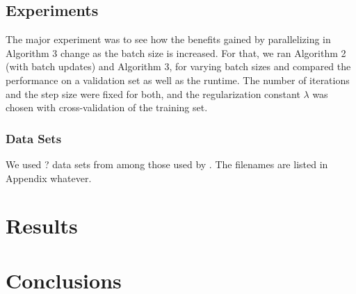 \documentclass{article}
\begin{document}
\subsection{Experiments} %
The major experiment was to see how the benefits gained by parallelizing in Algorithm 3 change as the batch size is increased.  For that, we ran Algorithm 2 (with batch updates) and Algorithm 3, for varying batch sizes and compared the performance on a validation set as well as the runtime. The number of iterations and the step size were fixed for both, and the regularization constant $\lambda$ was chosen with cross-validation of the training set.
\subsubsection{Data Sets}
We used ? data sets from among those used by \cite{shotgun2011}.  The filenames are listed in Appendix whatever.
\section{Results}
\section{Conclusions}



\end{document}
